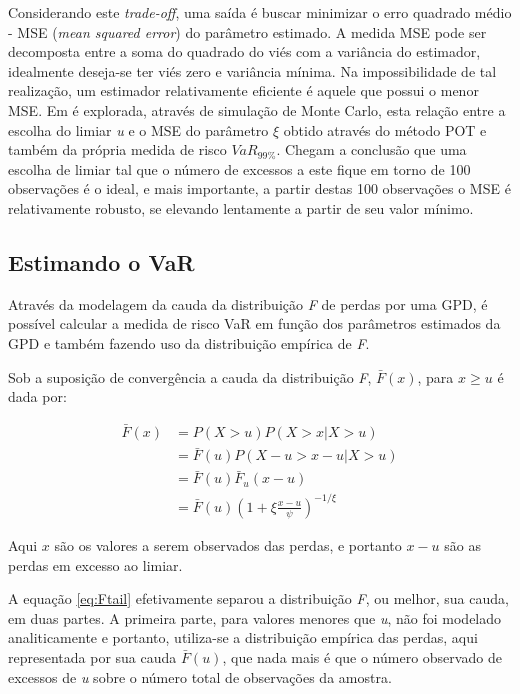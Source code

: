 \documentclass[1p]{elsarticle}
\theoremstyle{definition}
\begin{document}
Considerando este \emph{trade-off}, uma saída é buscar minimizar o erro quadrado médio - MSE (\emph{mean squared error}) do parâmetro estimado. A medida MSE pode ser decomposta entre a soma do quadrado do viés com a variância do estimador, idealmente deseja-se ter viés zero e variância mínima. Na impossibilidade de tal realização, um estimador relativamente eficiente é aquele que possui o menor MSE. Em \cite[seção 5.2.5, p. ~139]{McNeil2015} é explorada, através de simulação de Monte Carlo, esta relação entre a escolha do limiar \emph{u} e o MSE do parâmetro $\xi$ obtido através do método POT e também da própria medida de risco $VaR_{99\%}$. Chegam a conclusão que uma escolha de limiar tal que o número de excessos a este fique em torno de 100 observações é o ideal, e mais importante, a partir destas 100 observações o MSE é relativamente robusto, se elevando lentamente a partir de seu valor mínimo.

\subsection{Estimando o VaR}
\label{sec:var}

Através da modelagem da cauda da distribuição \emph{F} de perdas por uma GPD, é possível calcular a medida de risco VaR em função dos parâmetros estimados da GPD e também fazendo uso da distribuição empírica de \emph{F}.

Sob a suposição de convergência a cauda da distribuição \emph{F}, $\bar{F}(x)$, para $x \geq u$ é dada por:

\begin{align}
\label{eq:Ftail}
\bar{F}(x) & = P(X>u)P(X>x|X>u) \nonumber \\
& = \bar{F}(u) P(X-u>x-u|X>u) \nonumber \\
& = \bar{F}(u)\bar{F}_u(x-u) \nonumber \\
& = \bar{F}(u)\left(1+\xi \frac{x-u}{\psi}\right)^{-1/\xi}
\end{align}

Aqui $x$ são os valores a serem observados das perdas, e portanto $x-u$ são as perdas em excesso ao limiar.

A equação \eqref{eq:Ftail} efetivamente separou a distribuição \emph{F}, ou melhor, sua cauda, em duas partes. A primeira parte, para valores menores que \emph{u}, não foi modelado analiticamente e portanto, utiliza-se a distribuição empírica das perdas, aqui representada por sua cauda $\bar{F}(u)$, que nada mais é que o número observado de excessos de \emph{u} sobre o número total de observações da amostra.
\end{document}
